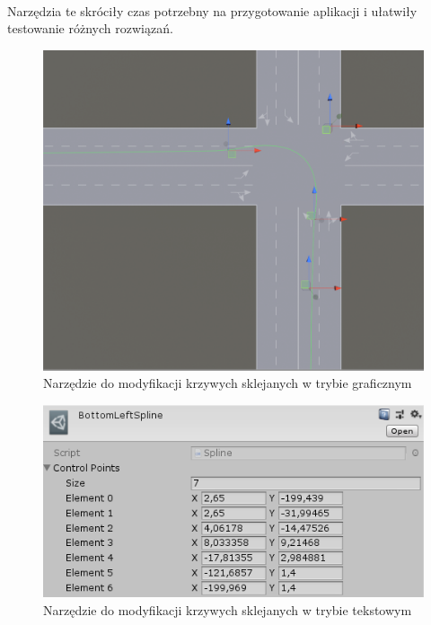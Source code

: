 \paragraph{}Narzędzia te skróciły czas potrzebny na przygotowanie aplikacji i ułatwiły testowanie różnych rozwiązań.
\begin{figure}
	\centering
	\includegraphics[width=1\linewidth]{ap6}
	\caption[Narzędzie do modyfikacji krzywych sklejanych w trybie graficznym]{Narzędzie do modyfikacji krzywych sklejanych w trybie graficznym}
	\label{fig:ap6}
\end{figure}
\begin{figure}
	\centering
	\includegraphics[width=0.8\linewidth]{ap7}
	\caption[Narzędzie do modyfikacji krzywych sklejanych w trybie tekstowym]{Narzędzie do modyfikacji krzywych sklejanych w trybie tekstowym}
	\label{fig:ap7}
\end{figure}
